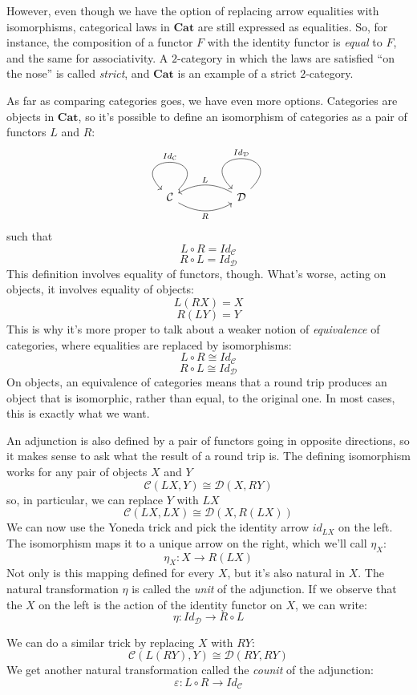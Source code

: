 \documentclass[DaoFP]{subfiles}
\begin{document}
However, even though we have the option of replacing arrow equalities with isomorphisms, categorical laws in $\mathbf{Cat}$ are still expressed as equalities. So, for instance, the composition of a functor $F$ with the identity functor is \emph{equal} to $F$, and the same for associativity. A $2$-category in which the laws are satisfied ``on the nose'' is called \emph{strict}, and $\mathbf{Cat}$ is an example of a strict $2$-category. 

As far as comparing categories goes, we have even more options. Categories are objects in $\mathbf{Cat}$, so it's possible to define an isomorphism of categories as a pair of functors $L$ and $R$:
\[
 \begin{tikzcd}
  \mathcal{C}
  \arrow[rr, bend right, "R"']
  \arrow[loop, "Id_{ \mathcal{C}} "']
  &&
  \mathcal{D}
  \arrow[ll, bend right, "L"']
  \arrow[loop, "Id_{ \mathcal{D}} "']
  \end{tikzcd}
\]
such that
\[ L \circ R = Id_{ \mathcal{C}} \]
\[ R \circ L = Id_{ \mathcal{D}} \]
This definition involves equality of functors, though. What's worse, acting on objects, it involves equality of objects:
\[ L (R X) = X \]
\[ R (L Y) = Y \]
This is why it's more proper to talk about a weaker notion of \emph{equivalence} of categories, where equalities are replaced by isomorphisms:
\[ L \circ R \cong Id_{ \mathcal{C}} \]
\[ R \circ L \cong Id_{ \mathcal{D}} \]
On objects, an equivalence of categories means that a round trip produces an object that is isomorphic, rather than equal, to the original one. In most cases, this is exactly what we want.

An adjunction is also defined by a pair of functors going in opposite directions, so it makes sense to ask what the result of a round trip is. The defining isomorphism works for any pair of objects $X$ and $Y$
\[  \mathcal{C} (L X, Y) \cong \mathcal{D}( X , R Y)\]
so, in particular, we can replace $Y$ with $L X$
\[  \mathcal{C} (L X, L X) \cong \mathcal{D}( X , R (L X))\]
We can now use the Yoneda trick and pick the identity arrow $id_{L X}$ on the left. The isomorphism maps it to a unique arrow on the right, which we'll call $\eta_X$:
\[ \eta_X \colon X \to R ( L X) \]
Not only is this mapping defined for every $X$, but it's also natural in $X$. The natural transformation $\eta$ is called the \emph{unit} of the adjunction. If we observe that the $X$ on the left is the action of the identity functor on $X$, we can write:
\[ \eta \colon Id_{\mathcal{D}} \to R \circ L \]

We can do a similar trick by replacing $X$ with $R Y$:
\[  \mathcal{C} (L (R Y), Y) \cong \mathcal{D}( R Y , R Y)\]
We get another natural transformation called the \emph{counit} of the adjunction:
\[ \varepsilon \colon L \circ R \to Id_{\mathcal{C}}  \]
\end{document}
